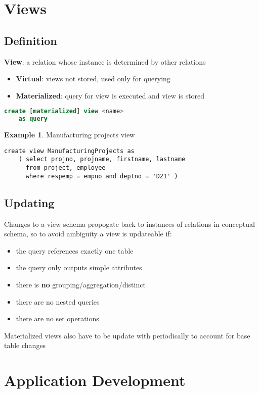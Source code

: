 \documentclass[]{article}
\theoremstyle{definition}
\newtheorem{ex}{Example}[section]
\begin{document}
	\section{Views} 
		\subsection{Definition}
			\textbf{View}: a relation whose instance is determined by other relations
			\begin{itemize}
				\item \textbf{Virtual}: views not stored, used only for querying
				\item \textbf{Materialized}: query for view is executed and view is stored
			\end{itemize}
			\begin{lstlisting}[language=SQL]
create [materialized] view <name>
	as query
			\end{lstlisting}
			\begin{ex}
				Manufacturing projects view
				\begin{lstlisting}
create view ManufacturingProjects as
	( select projno, projname, firstname, lastname
	  from project, employee
	  where respemp = empno and deptno = 'D21' )
				\end{lstlisting}
			\end{ex}
		\subsection{Updating}
			Changes to a view schema propogate back to instances of relations in conceptual schema, so to avoid ambiguity a view is updateable if:
			\begin{itemize}
				\item the query references exactly one table
				\item the query only outputs simple attributes
				\item there is \textbf{no} grouping/aggregation/distinct
				\item there are no nested queries
				\item there are no set operations
			\end{itemize}
			Materialized views also have to be update with periodically to account for base table changes
		
	\section{Application Development}
\end{document}
